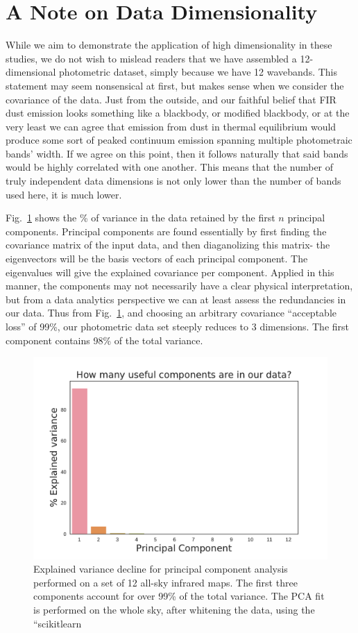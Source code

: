 \chapter*{A Note on Data Dimensionality}

While we aim to demonstrate the application of high dimensionality in these studies, we do not wish to mislead readers that we have assembled a 12-dimensional photometric dataset, simply because we have 12 wavebands. This statement may seem nonsensical at first, but makes sense when we consider the covariance of the data. Just from the outside, and our faithful belief that FIR dust emission looks something like a blackbody, or modified blackbody, or at the very least we can agree that emission from dust in thermal equilibrium would produce some sort of peaked continuum emission spanning multiple photometraic bands' width. If we agree on this point, then it follows naturally that said bands would be highly correlated with one another. This means that the number of truly independent data dimensions is not only lower than the number of bands used here, it is much lower.

Fig.~\ref{fig:pca_intro} shows the \% of variance in the data retained by the first $n$ principal components. Principal components are found essentially by first finding the covariance matrix of the input data, and then diaganolizing this matrix- the eigenvectors will be the basis vectors of each principal component. The eigenvalues will give the explained covariance per component. Applied in this manner, the components may not necessarily have a clear physical interpretation, but from a data analytics perspective we can at least assess the redundancies in our data. Thus from Fig.~\ref{fig:pca_intro}, and choosing an arbitrary covariance ``acceptable loss'' of 99\%, our photometric data set steeply reduces to 3 dimensions. The first component contains 98\% of the total variance.


\begin{figure}
  \includegraphics[width=\textwidth]{../Plots/ch_intro/pca_intro.pdf}
  \centering
  \caption{Explained variance decline for principal component analysis performed on a set of 12 all-sky infrared maps. The first three components account for over 99\% of the total variance. The PCA fit is performed on the whole sky, after whitening the data, using the ``scikitlearn }
  \label{fig:pca_intro}
\end{figure}
